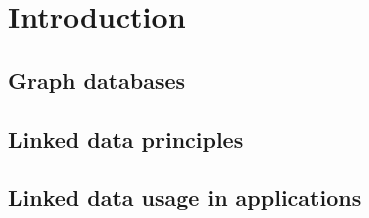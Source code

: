 \chapter{Introduction}

\section{Graph databases}
\section{Linked data principles}
\section{Linked data usage in applications}

